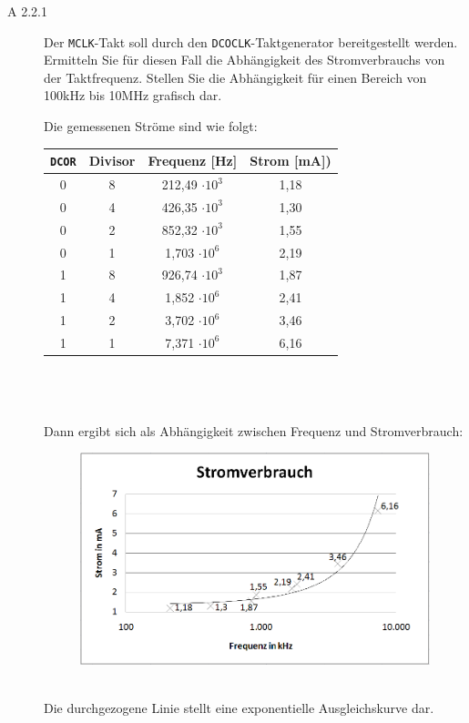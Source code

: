 \documentclass[11pt,a4paper,ngerman]{article}
\begin{document}
\begin{description}
	\item[A 2.2.1] Der \texttt{MCLK}-Takt soll durch den \texttt{DCOCLK}-Taktgenerator bereitgestellt werden. Ermitteln Sie für diesen Fall die Abhängigkeit des Stromverbrauchs von der Taktfrequenz. Stellen Sie die Abhängigkeit für einen Bereich von 100kHz bis 10MHz grafisch dar. 
	
	Die gemessenen Ströme sind wie folgt: \\
	\begin{tabular}{c|c|c|c}
	  \texttt{DCOR} & Divisor & Frequenz [Hz]  & Strom [mA]) \\
	\hline \hline
		0&	8&	212,49 $\cdot 10^3$&	1,18 \\
		0&	4&	426,35 $\cdot 10^3$&	1,30 \\
		0&	2&	852,32 $\cdot 10^3$&	1,55 \\
		0&	1&	1,703 $\cdot 10^6$	&	2,19 \\
		1&	8&	926,74 $\cdot 10^3$&	1,87 \\
		1&	4&	1,852 $\cdot 10^6$	&	2,41 \\
		1&	2&	3,702 $\cdot 10^6$	&	3,46 \\
		1&	1&	7,371 $\cdot 10^6$	&	6,16 \\
	\end{tabular}
	\\ \\ \\
	Dann ergibt sich als Abhängigkeit zwischen Frequenz und Stromverbrauch:
	\begin{figure}[h!]
			\hspace{1cm}
			\includegraphics[scale=0.5]{stromverbrauch.png}
		\end{figure}
		\\
	Die durchgezogene Linie stellt eine exponentielle Ausgleichskurve dar.
\end{description}
\end{document}
